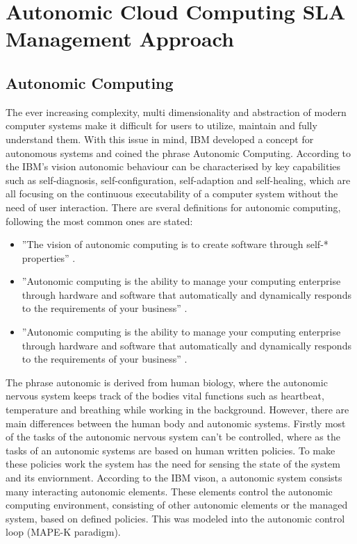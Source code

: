 
\chapter{Autonomic Cloud Computing SLA Management Approach} %
\label{ASLAMaaSApproach} %

\section{Autonomic Computing}
The ever increasing complexity, multi dimensionality and abstraction of modern computer systems make it difficult for users to utilize, maintain and fully understand them. With this issue in mind, IBM \cite{horn2001autonomic} developed a concept for autonomous systems and coined the phrase Autonomic Computing. According to the IBM’s vision autonomic behaviour can be characterised by key capabilities such as self-diagnosis, self-conﬁguration, self-adaption and self-healing, which are all focusing on the continuous executability of a computer system without the need of user interaction. There are sveral definitions for autonomic computing, following the most common ones are stated:

\begin{itemize} 
\item ''The vision of autonomic computing is to create software through self-* properties'' \cite{sterritt2005autonomic}.
\item ''Autonomic computing is the ability to manage your computing enterprise
through hardware and software that automatically and dynamically responds to the
requirements of your business'' \cite{murch2004autonomic}.
\item ''Autonomic computing is the ability to manage your computing enterprise
through hardware and software that automatically and dynamically responds to the
requirements of your business'' \cite{murch2004autonomic}.
\end{itemize} 

The phrase autonomic is derived from human biology, where the autonomic nervous system keeps track of the bodies vital functions such as heartbeat, temperature and breathing  while working in the background. However, there are main differences between the human body and autonomic systems. Firstly most of the tasks of the autonomic nervous system can't be controlled, where as the tasks of an autonomic systems are based on human written policies.
To make these policies work the system has the need for sensing the state of the system and its enviornment. According to the IBM vison, a autonomic system consists many interacting autonomic elements. These elements control the autonomic computing environment, consisting of other autonomic elements or the managed system, based on defined policies. This was modeled into the autonomic control loop (MAPE-K paradigm).


